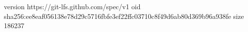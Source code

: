 version https://git-lfs.github.com/spec/v1
oid sha256:ee8eaf056138e78d29c5716fbfe3ef22ffc03710c8f49d6ab80d369b96a938fe
size 186237
